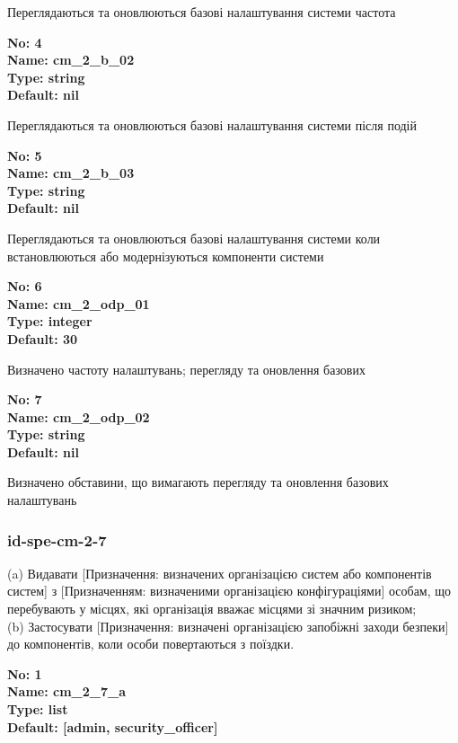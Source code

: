 \documentclass{article}
\begin{document}
{\footnotesize Переглядаються та оновлюються базові налаштування системи частота}


{\footnotesize\bfseries
No: 4\\
Name: cm\_\allowbreak{}2\_\allowbreak{}b\_\allowbreak{}02\\
Type: string\\
Default: nil
}

{\footnotesize Переглядаються та оновлюються базові налаштування системи після подій}


{\footnotesize\bfseries
No: 5\\
Name: cm\_\allowbreak{}2\_\allowbreak{}b\_\allowbreak{}03\\
Type: string\\
Default: nil
}

{\footnotesize Переглядаються та оновлюються базові налаштування системи коли встановлюються або модернізуються компоненти системи}


{\footnotesize\bfseries
No: 6\\
Name: cm\_\allowbreak{}2\_\allowbreak{}odp\_\allowbreak{}01\\
Type: integer\\
Default: 30
}

{\footnotesize Визначено частоту налаштувань; перегляду та оновлення базових}


{\footnotesize\bfseries
No: 7\\
Name: cm\_\allowbreak{}2\_\allowbreak{}odp\_\allowbreak{}02\\
Type: string\\
Default: nil
}

{\footnotesize Визначено обставини, що вимагають перегляду та оновлення базових налаштувань}




\subsubsection{id-spe-cm-2-7}
(a) Видавати [Призначення: визначених організацією систем або компонентів систем] з [Призначенням: визначеними організацією конфігураціями] особам, що перебувають у місцях, які організація вважає місцями зі значним ризиком;\\ 
(b) Застосувати [Призначення: визначені організацією запобіжні заходи безпеки] до компонентів, коли особи повертаються з поїздки.

\vspace{10pt}
{\footnotesize\bfseries
No: 1\\
Name: cm\_\allowbreak{}2\_\allowbreak{}7\_\allowbreak{}a\\
Type: list\\
Default: [\textquotedbl{}admin\textquotedbl{}, \textquotedbl{}security\_\allowbreak{}officer\textquotedbl{}]
}
\end{document}
